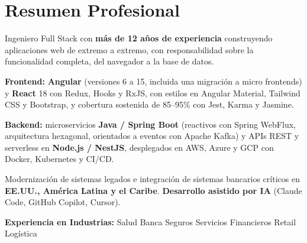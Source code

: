 
\section{Resumen Profesional}

{\small
Ingeniero Full Stack con \textbf{más de 12 años de experiencia} construyendo aplicaciones web de
extremo a extremo, con responsabilidad sobre la funcionalidad completa, del navegador a la base
de datos.

\vspace{3pt}
\textbf{Frontend:} \textbf{Angular} (versiones 6 a 15, incluida una migración a micro frontends) y
\textbf{React} 18 con Redux, Hooks y RxJS, con estilos en Angular Material, Tailwind CSS y
Bootstrap, y cobertura sostenida de 85--95\% con Jest, Karma y Jasmine.

\vspace{3pt}
\textbf{Backend:} microservicios \textbf{Java / Spring Boot} (reactivos con Spring WebFlux,
arquitectura hexagonal, orientados a eventos con Apache Kafka) y APIs REST y serverless en
\textbf{Node.js / NestJS}, desplegados en AWS, Azure y GCP con Docker, Kubernetes y CI/CD.

\vspace{3pt}
Modernización de sistemas legados e integración de sistemas bancarios críticos en
\textbf{EE.UU., América Latina y el Caribe}. \textbf{Desarrollo asistido por IA} (Claude Code,
GitHub Copilot, Cursor).
}

\vspace{4pt}
{\small\color{cvMuted}%
  \textbf{Experiencia en Industrias:}\enspace%
  Salud\enspace\textbar\enspace
  Banca\enspace\textbar\enspace
  Seguros\enspace\textbar\enspace
  Servicios Financieros\enspace\textbar\enspace
  Retail\enspace\textbar\enspace
  Logística%
}
